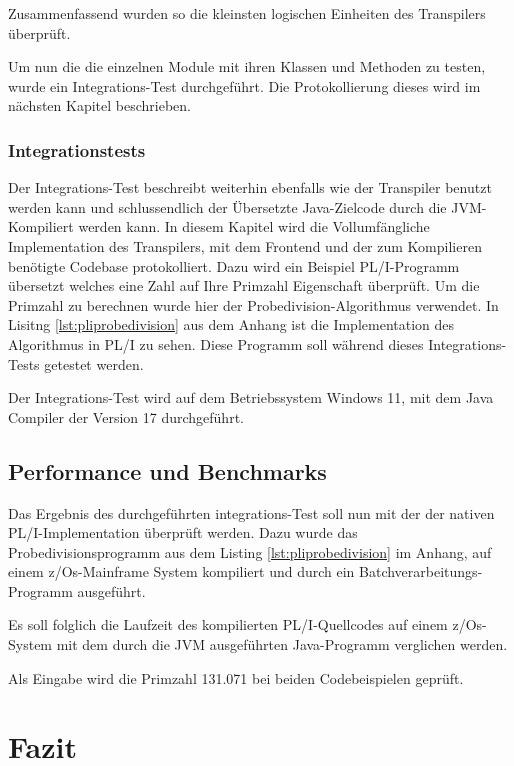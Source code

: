 Zusammenfassend wurden so die kleinsten logischen Einheiten des Transpilers überprüft.

Um nun die die einzelnen Module mit ihren Klassen und Methoden zu testen, wurde ein Integrations-Test durchgeführt.
Die Protokollierung dieses wird im nächsten Kapitel beschrieben.

\subsubsection{Integrationstests}
Der Integrations-Test beschreibt weiterhin ebenfalls wie der Transpiler benutzt werden kann und schlussendlich der Übersetzte Java-Zielcode
durch die JVM-Kompiliert werden kann.
In diesem Kapitel wird die Vollumfängliche Implementation des Transpilers, mit dem Frontend und der zum Kompilieren benötigte Codebase 
protokolliert.
Dazu wird ein Beispiel PL/I-Programm übersetzt welches eine Zahl auf Ihre Primzahl Eigenschaft überprüft.
Um die Primzahl zu berechnen wurde hier der Probedivision-Algorithmus verwendet.
In Lisitng \ref{lst:pliprobedivision} aus dem Anhang ist die Implementation des Algorithmus in PL/I zu sehen.
Diese Programm soll während dieses Integrations-Tests getestet werden.

Der Integrations-Test wird auf dem Betriebssystem Windows 11, mit dem Java Compiler der Version 17 durchgeführt.









\subsection{Performance und Benchmarks}
Das Ergebnis des durchgeführten integrations-Test soll nun mit der der nativen PL/I-Implementation überprüft werden.
Dazu wurde das Probedivisionsprogramm aus dem Listing \ref{lst:pliprobedivision} im Anhang, auf einem z/Os-Mainframe System kompiliert und durch ein Batchverarbeitungs-Programm ausgeführt.

Es soll folglich die Laufzeit des kompilierten PL/I-Quellcodes auf einem z/Os-System mit dem durch die JVM ausgeführten Java-Programm verglichen werden.

Als Eingabe wird die Primzahl 131.071 bei beiden Codebeispielen geprüft.



\section{Fazit}
